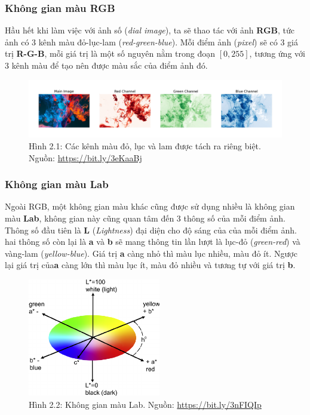 \documentclass[a4paper]{article}
\begin{document}
\subsubsection{Không gian màu RGB}
Hầu hết khi làm việc với ảnh số (\textit{dial image}), ta sẽ thao tác với ảnh \textbf{RGB}, tức ảnh có 3 kênh màu đỏ-lục-lam (\textit{red-green-blue}). Mỗi điểm ảnh (\textit{pixel}) sẽ có 3 giá trị \textbf{R-G-B}, mỗi giá trị là một số nguyên nằm trong đoạn $[0, 255]$, tương ứng với 3 kênh màu để tạo nên được màu sắc của điểm ảnh đó.

\begin{figure}[h!]
\centering
\includegraphics[width=16.1cm]{images/2_1.jpeg}
\caption{Hình 2.1: Các kênh màu đỏ, lục và lam được tách ra riêng biệt. Nguồn: \href{https://bit.ly/3eKaaBj}{https://bit.ly/3eKaaBj}}
\end{figure}

\subsubsection{Không gian màu Lab}
Ngoài RGB, một không gian màu khác cũng được sử dụng nhiều là không gian màu \textbf{Lab}, không gian này cũng quan tâm đến 3 thông số của mỗi điểm ảnh. Thông số đầu tiên là \textbf{L} (\textit{Lightness}) đại diện cho độ sáng của của mỗi điểm ảnh. hai thông số còn lại là \textbf{a} và \textbf{b} sẽ mang thông tin lần lượt là lục-đỏ (\textit{green-red}) và vàng-lam (\textit{yellow-blue}). Giá trị \textbf{a} càng nhỏ thì màu lục nhiều, màu đỏ ít. Ngược lại giá trị của\textbf{a} càng lớn thì màu lục ít, màu đỏ nhiều và tương tự với giá trị \textbf{b}.

\begin{figure}[h!]
\centering
\includegraphics[width=5.8cm]{images/2_2.png}
\caption{Hình 2.2: Không gian màu Lab. Nguồn: \href{https://bit.ly/3nFIQIp}{https://bit.ly/3nFIQIp}}
\end{figure}
\end{document}
